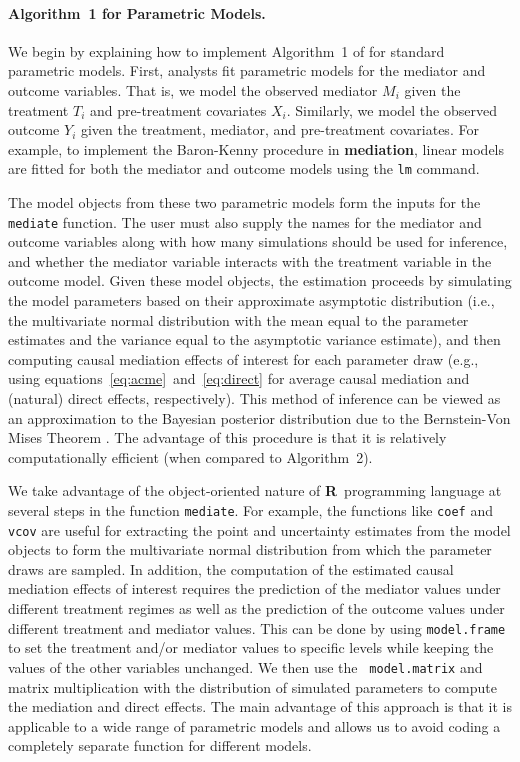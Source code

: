 \documentclass[11pt,letterpaper]{article}
\theoremstyle{plain}
\newcommand\bR{{\bf R}}
\newcommand\bmediation{{\bf mediation}}
\begin{document}
\paragraph{Algorithm~1 for Parametric Models.}

We begin by explaining how to implement Algorithm~1 of
\citet{imai:keel:ting:10} for standard parametric models.  First,
analysts fit parametric models for the mediator and outcome
variables. That is, we model the observed mediator $M_i$ given the
treatment $T_i$ and pre-treatment covariates $X_i$.  Similarly, we
model the observed outcome $Y_i$ given the treatment, mediator, and
pre-treatment covariates.  For example, to implement the Baron-Kenny
procedure in \bmediation, linear models are fitted for both the
mediator and outcome models using the {\tt lm} command.

The model objects from these two parametric models form the inputs for
the {\tt mediate} function.  The user must also supply the names for
the mediator and outcome variables along with how many simulations
should be used for inference, and whether the mediator variable
interacts with the treatment variable in the outcome model.  Given
these model objects, the estimation proceeds by simulating the model
parameters based on their approximate asymptotic distribution (i.e.,
the multivariate normal distribution with the mean equal to the
parameter estimates and the variance equal to the asymptotic variance
estimate), and then computing causal mediation effects of interest for
each parameter draw (e.g., using
equations~\eqref{eq:acme}~and~\eqref{eq:direct} for average causal
mediation and (natural) direct effects, respectively).  This method of
inference can be viewed as an approximation to the Bayesian posterior
distribution due to the Bernstein-Von Mises Theorem
\citep{king:tomz:witt:00}.  The advantage of this procedure is that it
is relatively computationally efficient (when compared to
Algorithm~2).

We take advantage of the object-oriented nature of \bR\ programming
language at several steps in the function {\tt mediate}.  For
example, the functions like {\tt coef} and {\tt vcov} are useful
for extracting the point and uncertainty estimates from the model
objects to form the multivariate normal distribution from which the
parameter draws are sampled.  In addition, the computation of the
estimated causal mediation effects of interest requires the prediction
of the mediator values under different treatment regimes as well as
the prediction of the outcome values under different treatment and
mediator values.  This can be done by using {\tt model.frame} to set
the treatment and/or mediator values to specific levels while keeping
the values of the other variables unchanged.  We then use the {\tt
  model.matrix} and matrix multiplication with the distribution of
simulated parameters to compute the mediation and direct effects.  The
main advantage of this approach is that it is applicable to a wide
range of parametric models and allows us to avoid coding a completely
separate function for different models.
\end{document}
